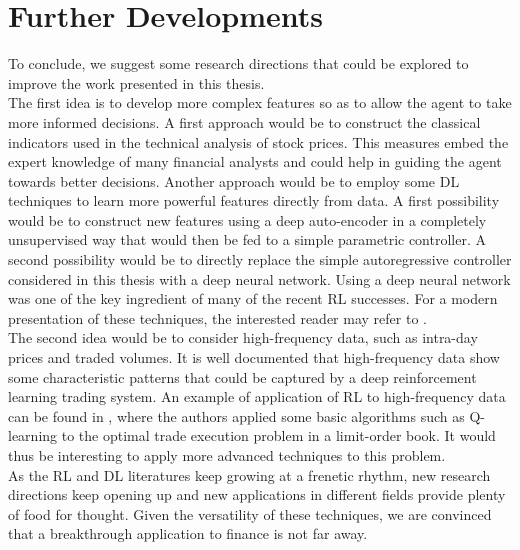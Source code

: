 \section{Further Developments}
To conclude, we suggest some research directions that could be explored to improve the work presented in this thesis.\\ 
The first idea is to develop more complex features so as to allow the agent to take more informed decisions. A first approach would be to construct the classical indicators used in the technical analysis of stock prices. This measures embed the expert knowledge of many financial analysts and could help in guiding the agent towards better decisions. Another approach would be to employ some \gls{DL} techniques to learn more powerful features directly from data. A first possibility would be to construct new features using a deep auto-encoder in a completely unsupervised way that would then be fed to a simple parametric controller. A second possibility would be to directly replace the simple autoregressive controller considered in this thesis with a deep neural network. Using a deep neural network was one of the key ingredient of many of the recent \gls{RL} successes. For a modern presentation of these techniques, the interested reader may refer to \cite{Goodfellow-et-al-2016-Book}.\\
The second idea would be to consider high-frequency data, such as intra-day prices and traded volumes. It is well documented that high-frequency data show some characteristic patterns that could be captured by a deep reinforcement learning trading system. An example of application of \gls{RL} to high-frequency data can be found in \cite{nevmyvaka2006reinforcement}, where the authors applied some basic algorithms such as Q-learning to the optimal trade execution problem in a limit-order book. It would thus be interesting to apply more advanced techniques to this problem.\\
As the \gls{RL} and \gls{DL} literatures keep growing at a frenetic rhythm, new research directions keep opening up and new applications in different fields provide plenty of food for thought. Given the versatility of these techniques, we are convinced that a breakthrough application to finance is not far away. 


